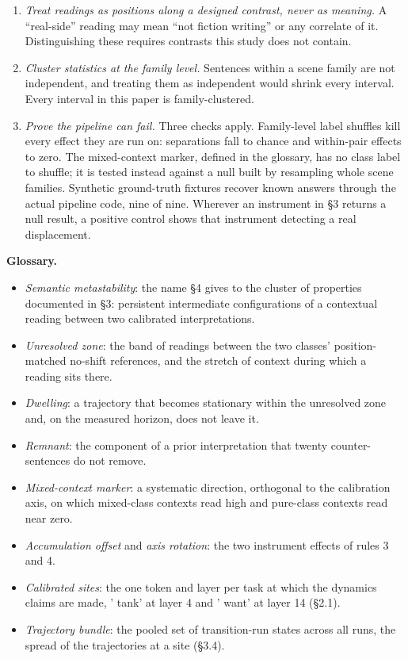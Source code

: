 \documentclass[11pt]{article}
\begin{document}
\begin{enumerate}
throughout to no-shift runs read with the same axis, as rule 3 requires. Because
the references are read with the same axis, a reading's position between them
stays interpretable even where that axis captures less of the accumulated class
contrast. The per-layer analyses use the refit axes. Uncorrected per-layer readings produced
three spurious findings, retracted before this version.
\item \emph{Treat readings as positions along a designed contrast, never as meaning.} A ``real-side'' reading may mean ``not fiction writing'' or any correlate of it. Distinguishing
these requires contrasts this study does not contain.
\item \emph{Cluster statistics at the family level.} Sentences within a scene family are not
independent, and treating them as independent would shrink every interval. Every
interval in this paper is family-clustered.
\item \emph{Prove the pipeline can fail.} Three checks apply. Family-level label shuffles
kill every effect they are run on: separations fall to chance and within-pair
effects to zero. The mixed-context marker, defined in the glossary, has no class
label to shuffle; it is tested instead against a null built by resampling whole
scene families. Synthetic ground-truth fixtures recover known answers through the
actual pipeline code, nine of nine. Wherever an instrument in \S3 returns a null result, a positive control shows that
instrument detecting a real displacement.
\end{enumerate}

\textbf{Glossary.}

\begin{itemize}
\item \emph{Semantic metastability}: the name \S4 gives to the cluster of properties documented
in \S3: persistent intermediate configurations of a contextual reading between two
calibrated interpretations.
\item \emph{Unresolved zone}: the band of readings between the two classes' position-matched
no-shift references, and the stretch of context during which a reading sits there.
\item \emph{Dwelling}: a trajectory that becomes stationary within the unresolved zone and, on
the measured horizon, does not leave it.
\item \emph{Remnant}: the component of a prior interpretation that twenty counter-sentences do
not remove.
\item \emph{Mixed-context marker}: a systematic direction, orthogonal to the calibration axis,
on which mixed-class contexts read high and pure-class contexts read near zero.
\item \emph{Accumulation offset} and \emph{axis rotation}: the two instrument effects of rules 3
and 4.
\item \emph{Calibrated sites}: the one token and layer per task at which the dynamics claims
are made, ' tank' at layer 4 and ' want' at layer 14 (\S2.1).
\item \emph{Trajectory bundle}: the pooled set of transition-run states across all runs, the
spread of the trajectories at a site (\S3.4).
\end{itemize}
\end{document}
